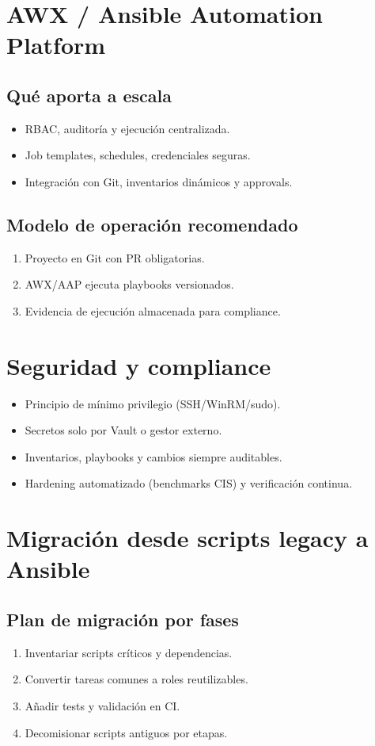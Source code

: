 \documentclass[12pt,a4paper]{article}
\begin{document}
\section{AWX / Ansible Automation Platform}

\subsection{Qué aporta a escala}
\begin{itemize}
  \item RBAC, auditoría y ejecución centralizada.
  \item Job templates, schedules, credenciales seguras.
  \item Integración con Git, inventarios dinámicos y approvals.
\end{itemize}

\subsection{Modelo de operación recomendado}
\begin{enumerate}
  \item Proyecto en Git con PR obligatorias.
  \item AWX/AAP ejecuta playbooks versionados.
  \item Evidencia de ejecución almacenada para compliance.
\end{enumerate}

\section{Seguridad y compliance}

\begin{itemize}
  \item Principio de mínimo privilegio (SSH/WinRM/sudo).
  \item Secretos solo por Vault o gestor externo.
  \item Inventarios, playbooks y cambios siempre auditables.
  \item Hardening automatizado (benchmarks CIS) y verificación continua.
\end{itemize}

\section{Migración desde scripts legacy a Ansible}

\subsection{Plan de migración por fases}
\begin{enumerate}
  \item Inventariar scripts críticos y dependencias.
  \item Convertir tareas comunes a roles reutilizables.
  \item Añadir tests y validación en CI.
  \item Decomisionar scripts antiguos por etapas.
\end{enumerate}
\end{document}
